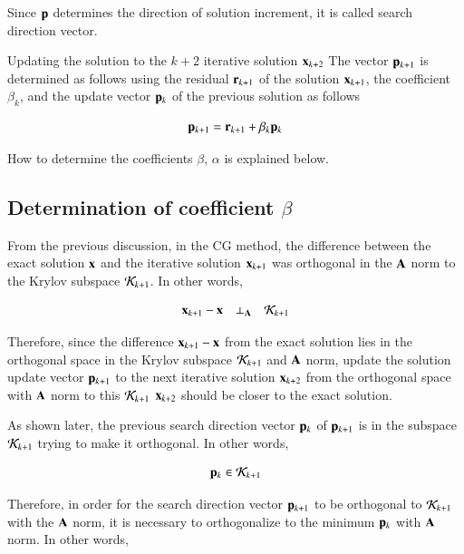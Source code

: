 Since $\mathbf{p}$ determines the direction of solution increment, it is called search direction vector.

Updating the solution to the $k+2$ iterative solution $\mathbf{x}_{k+2}$ The vector $\mathbf{p}_{k+1}$ is determined as follows using the residual $\mathbf{r}_{k+1}$ of the solution $\mathbf{x}_{k+1}$, the coefficient $\beta_k$, and the update vector $\mathbf{p}_k$ of the previous solution as follows


\begin{equation}
\mathbf{p}_{k+1}=\mathbf{r}_{k+1}+\beta_k\mathbf{p}_k
\end{equation}


How to determine the coefficients $\beta$, $\alpha$ is explained below.



\subsection{Determination of coefficient $\beta$}


From the previous discussion, in the CG method, the difference between the exact solution $\mathbf{x}$ and the iterative solution $\mathbf{x}_{k+1}$ was orthogonal in the $\mathbf{A}$ norm to the Krylov subspace ${\cal K}_{k+1}$. In other words,

\begin{equation}
\mathbf{x}_{k+1}-\mathbf{x}\quad\bot_{\mathbf{A}}\quad{\cal K}_{k+1}
\end{equation}


Therefore, since the difference $\mathbf{x}_{k+1}-\mathbf{x}$ from the exact solution lies in the orthogonal space in the Krylov subspace ${\cal K}_{k+1}$ and $\mathbf{A}$ norm, update the solution update vector $\mathbf{p}_{k+1}$ to the next iterative solution $\mathbf{x}_{k+2}$ from the orthogonal space with $\mathbf{A}$ norm to this ${\cal K}_{k+1}$ $\mathbf{x}_{k+2}$ should be closer to the exact solution.

As shown later, the previous search direction vector $\mathbf{p}_k$ of $\mathbf{p}_{k+1}$ is in the subspace ${\cal K}_{k+1}$ trying to make it orthogonal. In other words,

\begin{equation}
\mathbf{p}_k\in{\cal K}_{k+1}
\end{equation}


Therefore, in order for the search direction vector $\mathbf{p}_{k+1}$ to be orthogonal to ${\cal K}_{k+1}$ with the $\mathbf{A}$ norm, it is necessary to orthogonalize to the minimum $\mathbf{p}_k$ with $\mathbf{A}$ norm. In other words,

